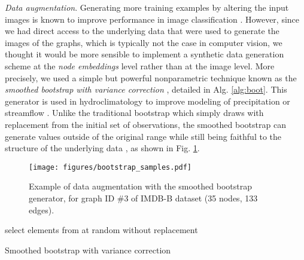 \documentclass[runningheads]{llncs}
\begin{document}
\textit{Data augmentation}.
Generating more training examples by altering the input images is known to improve performance in image classification \cite{krizhevsky2012imagenet}. However, since we had direct access to the underlying data that were used to generate the images of the graphs, which is typically not the case in computer vision, we thought it would be more sensible to implement a synthetic data generation scheme at the \textit{node embeddings} level rather than at the image level. More precisely, we used a simple but powerful nonparametric technique known as the \textit{smoothed bootstrap with variance correction} \cite{silverman1986density}, detailed in Alg. \ref{alg:boot}. This generator is used in hydroclimatology to improve modeling of precipitation \cite{lall1996nonparametric} or streamflow \cite{sharma1997streamflow}. Unlike the traditional bootstrap \cite{efron1992bootstrap} which simply draws with replacement from the initial set of observations, the smoothed bootstrap can generate values outside of the original range while still being faithful to the structure of the underlying data \cite{rajagopalan1997multivariate,tixier2017construction}, as shown in Fig. \ref{fig:boot}.

\vspace{-0.25cm}

\begin{figure}[h]
  \centering
    \texttt{[image: figures/bootstrap\_samples.pdf]}
\captionsetup{justification=justified,singlelinecheck=false, size=small}
    \caption{Example of data augmentation with the smoothed bootstrap generator, for graph ID \#3 of IMDB-B dataset (35 nodes, 133 edges).}
\label{fig:boot}
\end{figure}

\vspace{-1.5cm}

\begin{algorithm}[h]
     select  elements from  at random without replacement\\
\Return{}
\caption{Smoothed bootstrap with variance correction \label{alg:boot}}
\end{algorithm}
\end{document}
